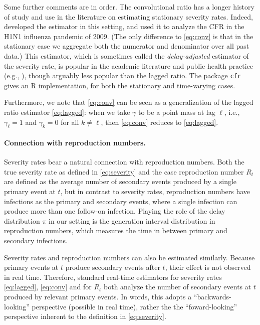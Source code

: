\documentclass{article}
\begin{document}
Some further comments are in order. The convolutional ratio has a longer history
of study and use in the literature on estimating stationary severity
rates. Indeed, \citet{nishiura} developed the estimator in this setting,  
and used it to analyze the CFR in the H1N1 influenza pandemic of 2009. (The only 
difference to \eqref{eq:conv} is that in the stationary case we aggregate both
the numerator and denominator over all past data.) This estimator, which is
sometimes called the \emph{delay-adjusted} estimator of the severity rate, is
popular in the academic literature and public health practice (e.g., 
\citealp{nishiuraEx1, nishiuraEx2, Russell2020, Unnikrishnan2021}), though   
arguably less popular than the lagged ratio. The package \texttt{cfr}
\citep{cfr_package} gives an R implementation, for both the stationary and
time-varying cases.  

Furthermore, we note that \eqref{eq:conv} can be seen as a generalization of the  
lagged ratio estimator \eqref{eq:lagged}: when we take $\gamma$ to be a point
mass at lag $\ell$, i.e., $\gamma_\ell = 1$ and $\gamma_k = 0$ for all $k \not=
\ell$, then \eqref{eq:conv} reduces to \eqref{eq:lagged}.   

\paragraph{Connection with reproduction numbers.} 

Severity rates bear a natural connection with reproduction numbers. Both the
true severity rate as defined in \eqref{eq:severity} and the case reproduction
number $R_t$ are defined as the average number of secondary events produced by a
single primary event at $t$, but in contrast to severity rates, reproduction
numbers have infections as the primary and secondary events, where a single
infection can produce more than one follow-on infection. Playing the role of the
delay distribution $\pi$ in our setting is the generation interval distribution
in reproduction numbers, which measures the time in between primary and
secondary infections.  

Severity rates and reproduction numbers can also be estimated similarly. Because
primary events at $t$ produce secondary events after $t$, their effect is not
observed in real time. Therefore, standard real-time estimators for severity
rates \eqref{eq:lagged}, \eqref{eq:conv} and for $R_t$ both analyze the number
of  secondary events at $t$ produced by relevant primary events. In words, this 
adopts a ``backwards-looking'' perspective (possible in real time), rather the 
the ``foward-looking'' perspective inherent to the definition in
\eqref{eq:severity}. 
\end{document}
